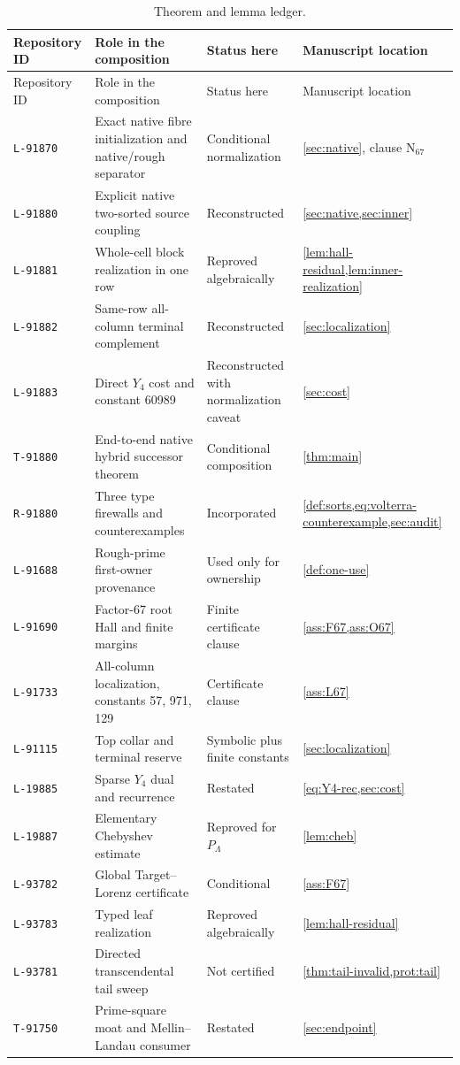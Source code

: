 \documentclass[11pt]{article}
\theoremstyle{definition}
\theoremstyle{remark}
\newcommand{\1}{\mathbf 1}
\newcommand{\repoid}[1]{\texttt{#1}}
\begin{document}
\begin{longtable}{@{}p{}p{}p{}p{}@{}}
\caption{Theorem and lemma ledger.}\label{tab:ledger}\\
\toprule
Repository ID & Role in the composition & Status here & Manuscript location\\
\midrule
\endfirsthead
\toprule
Repository ID & Role in the composition & Status here & Manuscript location\\
\midrule
\endhead
\repoid{L-91870} & Exact native fibre initialization and native/rough separator & Conditional normalization & \cref{sec:native}, clause \(\mathrm N_{67}\)\\
\repoid{L-91880} & Explicit native two-sorted source coupling & Reconstructed & \cref{sec:native,sec:inner}\\
\repoid{L-91881} & Whole-cell block realization in one row & Reproved algebraically & \cref{lem:hall-residual,lem:inner-realization}\\
\repoid{L-91882} & Same-row all-column terminal complement & Reconstructed & \cref{sec:localization}\\
\repoid{L-91883} & Direct \(Y_4\) cost and constant 60989 & Reconstructed with normalization caveat & \cref{sec:cost}\\
\repoid{T-91880} & End-to-end native hybrid successor theorem & Conditional composition & \cref{thm:main}\\
\repoid{R-91880} & Three type firewalls and counterexamples & Incorporated & \cref{def:sorts,eq:volterra-counterexample,sec:audit}\\
\repoid{L-91688} & Rough-prime first-owner provenance & Used only for ownership & \cref{def:one-use}\\
\repoid{L-91690} & Factor-67 root Hall and finite margins & Finite certificate clause & \cref{ass:F67,ass:O67}\\
\repoid{L-91733} & All-column localization, constants 57, 971, 129 & Certificate clause & \cref{ass:L67}\\
\repoid{L-91115} & Top collar and terminal reserve & Symbolic plus finite constants & \cref{sec:localization}\\
\repoid{L-19885} & Sparse \(Y_4\) dual and recurrence & Restated & \cref{eq:Y4-rec,sec:cost}\\
\repoid{L-19887} & Elementary Chebyshev estimate & Reproved for \(P_\Lambda\) & \cref{lem:cheb}\\
\repoid{L-93782} & Global Target--Lorenz certificate & Conditional & \cref{ass:F67}\\
\repoid{L-93783} & Typed leaf realization & Reproved algebraically & \cref{lem:hall-residual}\\
\repoid{L-93781} & Directed transcendental tail sweep & Not certified & \cref{thm:tail-invalid,prot:tail}\\
\repoid{T-91750} & Prime-square moat and Mellin--Landau consumer & Restated & \cref{sec:endpoint}\\
\bottomrule
\end{longtable}
\end{document}
